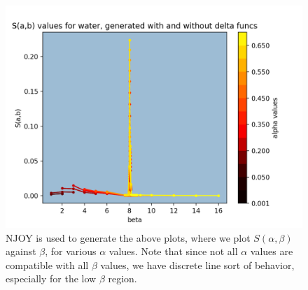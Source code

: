 \documentclass[10pt]{article}
\begin{document}
            \begin{figure}[H]
              \begin{center}
              \includegraphics[scale=0.6]{sab_thinTriangle_and_delta_all_AB}
                \caption{NJOY is used to generate the above plots, where we plot $S(\alpha,\beta)$ against $\beta$, for various $\alpha$ values. Note that since not all $\alpha$ values are compatible with all $\beta$ values, we have discrete line sort of behavior, especially for the low $\beta$ region. }
              \label{fig:sabThinTriangleAllAB}
              \end{center}
            \end{figure}
\end{document}
